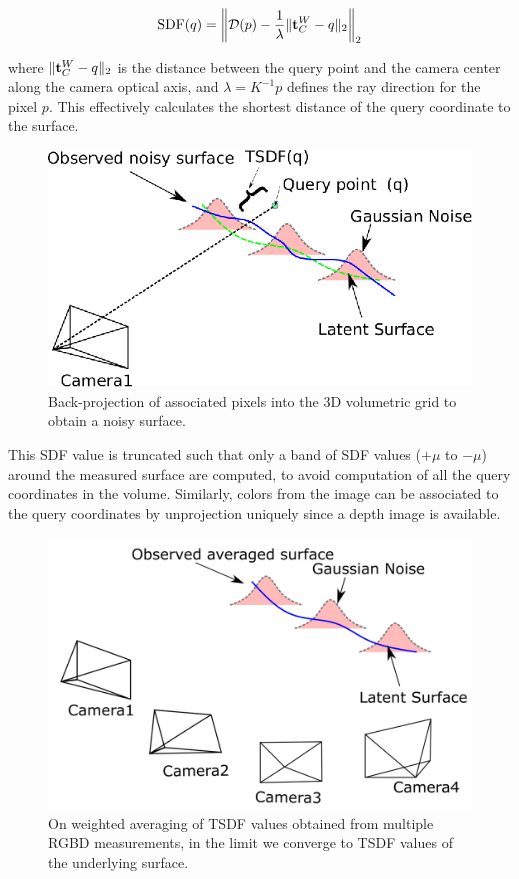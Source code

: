 \begin{align}
    \text{SDF}(q) =  \left\lVert \mathcal{D}(p) - \frac{1}{\lambda} \|\mathbf{t}_C^W - q\|_2 \right\rVert_2
\end{align}

 where $\| \mathbf{t}_C^W - q \|_2$ is the distance between the query point and the camera center along the camera optical axis, and $\lambda = K^{-1} p$ defines the ray direction for the pixel $p$. This effectively calculates the shortest distance of the query coordinate to the surface.

\begin{figure}[htpb]
    \centering
    \includegraphics[width=0.6\linewidth]{figs/tsdf-integration-single}
    \caption{Back-projection of associated pixels into the 3D volumetric grid to obtain a noisy surface.}%
    \label{fig:tsdf-single-image}
\end{figure}

This SDF value is truncated such that only a band of SDF values ($+\mu$ to $-\mu$) around the measured surface are computed, to avoid computation of all the query coordinates in the volume.
Similarly, colors from the image can be associated to the query coordinates by unprojection uniquely since a depth image is available.

\begin{figure}[htpb]
    \centering
    \includegraphics[width=0.5\linewidth]{figs/tsdf-multiple-images.png}
    \caption{On weighted averaging of TSDF values obtained from multiple RGBD measurements, in the limit we converge to TSDF values of the underlying surface.}%
    \label{fig:tsdf-multiple-images}
\end{figure}

